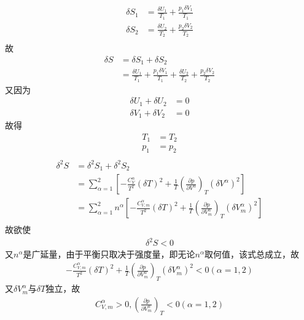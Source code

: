 \documentclass{phyasgn}
\begin{document}
\begin{sol}[2]
    \begin{align*}
        \delta S_1&=\frac{\delta U_1}{T_1}+\frac{p_1\delta V_1}{T_1}\\
        \delta S_2&=\frac{\delta U_2}{T_2}+\frac{p_2\delta V_2}{T_2}\\
    \end{align*}
    故
    \begin{align*}
        \delta S&=\delta S_1+\delta S_2\\
        &=\frac{\delta U_1}{T_1}+\frac{p_1\delta V_1}{T_1}+\frac{\delta U_2}{T_2}+\frac{p_2\delta V_2}{T_2}
    \end{align*}
    又因为
    \begin{align*}
        \delta U_1+\delta U_2&=0\\
        \delta V_1+\delta V_2&=0
    \end{align*}
    故得
    \begin{align*}
        T_1&=T_2\\
        p_1&=p_2\\
    \end{align*}
    \begin{align*}
        \delta^2S&=\delta^2S_1+\delta^2S_2\\
        &=\sum_{\alpha=1}^{2}\left[-\frac{C_V^\alpha}{T^2}(\delta T)^2+\frac{1}{T}(\frac{\partial p}{\partial V^\alpha})_T(\delta V^\alpha)^2\right]\\
        &=\sum_{\alpha=1}^{2}n^\alpha\left[-\frac{C_{V,m}^\alpha}{T^2}(\delta T)^2+\frac{1}{T}(\frac{\partial p}{\partial V_m^\alpha})_T(\delta V_m^\alpha)^2\right]\\
    \end{align*}
    故欲使
    \begin{align*}
        \delta^2S<0
    \end{align*}
    又$n^\alpha$是广延量，由于平衡只取决于强度量，即无论$n^\alpha$取何值，该式总成立，故
    \begin{align*}
        -\frac{C_{V,m}^\alpha}{T^2}(\delta T)^2+\frac{1}{T}(\frac{\partial p}{\partial V_m^\alpha})_T(\delta V_m^\alpha)^2<0(\alpha=1,2)
    \end{align*}
    又$\delta V_m^\alpha$与$\delta T$独立，故
    \begin{align*}
        C_{V,m}^\alpha>0,(\frac{\partial p}{\partial V_m^\alpha})_T<0(\alpha=1,2)
    \end{align*}
\end{sol}\par
\end{document}
